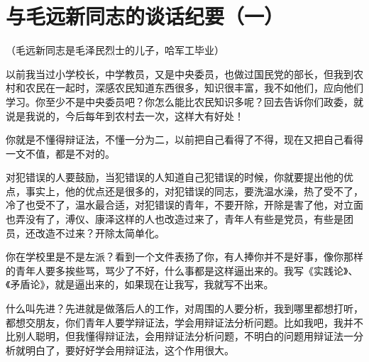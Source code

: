 \section[与毛远新同志的谈话纪要（一）（一九六四年二月）]{与毛远新同志的谈话纪要（一）}


{\small\kaishu （毛远新同志是毛泽民烈士的儿子，哈军工毕业）}

以前我当过小学校长，中学教员，又是中央委员，也做过国民党的部长，但我到农村和农民在一起时，深感农民知道东西很多，知识很丰富，我不如他们，应向他们学习。你至少不是中央委员吧？你怎么能比农民知识多呢？回去告诉你们政委，就说是我说的，今后每年到农村去一次，这样大有好处！

你就是不懂得辩证法，不懂一分为二，以前把自己看得了不得，现在又把自己看得一文不值，都是不对的。

对犯错误的人要鼓励，当犯错误的人知道自己犯错误的时候，你就要提出他的优点，事实上，他的优点还是很多的，对犯错误的同志，要洗温水澡，热了受不了，冷了也受不了，温水最合适，对犯错误的青年，不要开除，开除是害了他，对立面也弄没有了，溥仪、康泽这样的人也改造过来了，青年人有些是党员，有些是团员，还改造不过来？开除太简单化。

你在学校里是不是左派？看到一个文件表扬了你，有人捧你并不是好事，像你那样的青年人要多挨些骂，骂少了不好，什么事都是这样逼出来的。我写《实践论》、《矛盾论》，就是逼出来的，如果现在让我写，我就写不出来。

什么叫先进？先进就是做落后人的工作，对周围的人要分析，我到哪里都想打听，都想交朋友，你们青年人要学辩证法，学会用辩证法分析问题。比如我吧，我并不比别人聪明，但我懂得辩证法，会用辩证法分析问题，不明白的问题用辩证法一分析就明白了，要好好学会用辩证法，这个作用很大。

